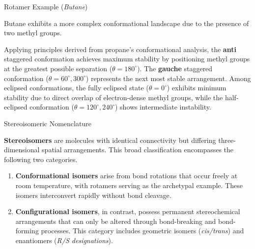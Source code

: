 \documentclass[10pt]{article}
\begin{document}
    \begin{core}{Rotamer Example (\textit{Butane})}
        
      Butane exhibits a more complex conformational landscape due to the presence of two methyl groups.

       
      Applying principles derived from propane's conformational analysis, the \textbf{anti} staggered conformation achieves maximum stability by positioning methyl groups at the greatest possible separation ($\theta = 180^{\circ}$). The \textbf{gauche} staggered conformation ($\theta = 60^{\circ}, 300^{\circ}$) represents the next most stable arrangement. Among eclipsed conformations, the fully eclipsed state ($\theta = 0^{\circ}$) exhibits minimum stability due to direct overlap of electron-dense methyl groups, while the half-eclipsed conformation ($\theta = 120^{\circ}, 240^{\circ}$) shows intermediate instability.


    \end{core}

    \begin{core}{Stereoisomeric Nomenclature}

      \textbf{Stereoisomers} are molecules with identical connectivity but differing three-dimensional spatial arrangements. This broad classification encompasses the following two categories.

      \begin{enumerate}

        \item \textbf{Conformational isomers} arise from bond rotations that occur freely at room temperature, with rotamers serving as the archetypal example. These isomers interconvert rapidly without bond cleavage.

        \item \textbf{Configurational isomers}, in contrast, possess permanent stereochemical arrangements that can only be altered through bond-breaking and bond-forming processes. This category includes geometric isomers (\textit{cis/trans}) and enantiomers (\textit{R/S designations}).

      \end{enumerate}
        
    \end{core}
\end{document}
